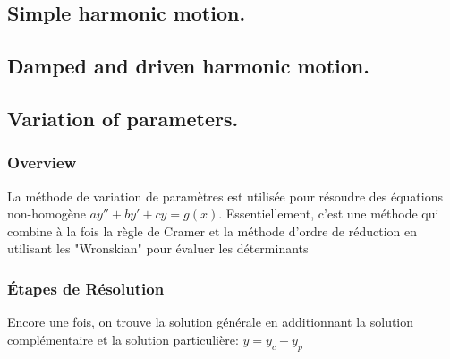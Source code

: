 \documentclass{article}
\begin{document}
\subsection{Simple harmonic motion.}
\subsection{Damped and driven harmonic motion.}
\subsection{Variation of parameters.}

\subsubsection{Overview}%
\label{ssub:Overview}

La méthode de variation de paramètres est utilisée pour résoudre des
équations non-homogène $ ay''+by'+cy=g(x)$. Essentiellement, c'est une
méthode qui combine à la fois la règle de Cramer et la méthode d'ordre
de réduction en utilisant les "Wronskian" pour évaluer les déterminants

\subsubsection{Étapes de Résolution}%
\label{ssub:Étapes de Résolution}

Encore une fois, on trouve la solution générale en additionnant la
solution complémentaire et la solution particulière: $y=y_c+y_p$
\end{document}
